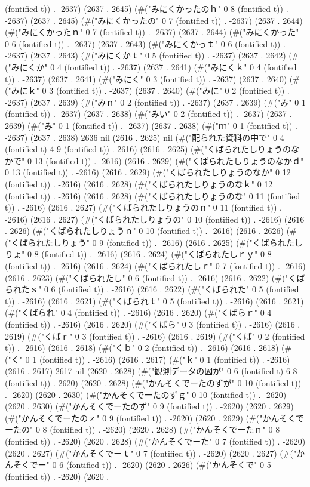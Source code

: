 (fontified t)) . -2637) (2637 . 2645) (#("みにくかったのｈ" 0 8 (fontified t)) . -2637) (2637 . 2645) (#("みにくかったの" 0 7 (fontified t)) . -2637) (2637 . 2644) (#("みにくかったｎ" 0 7 (fontified t)) . -2637) (2637 . 2644) (#("みにくかった" 0 6 (fontified t)) . -2637) (2637 . 2643) (#("みにくかっｔ" 0 6 (fontified t)) . -2637) (2637 . 2643) (#("みにくかｔ" 0 5 (fontified t)) . -2637) (2637 . 2642) (#("みにくか" 0 4 (fontified t)) . -2637) (2637 . 2641) (#("みにくｋ" 0 4 (fontified t)) . -2637) (2637 . 2641) (#("みにく" 0 3 (fontified t)) . -2637) (2637 . 2640) (#("みにｋ" 0 3 (fontified t)) . -2637) (2637 . 2640) (#("みに" 0 2 (fontified t)) . -2637) (2637 . 2639) (#("みｎ" 0 2 (fontified t)) . -2637) (2637 . 2639) (#("み" 0 1 (fontified t)) . -2637) (2637 . 2638) (#("みい" 0 2 (fontified t)) . -2637) (2637 . 2639) (#("み" 0 1 (fontified t)) . -2637) (2637 . 2638) (#("ｍ" 0 1 (fontified t)) . -2637) (2637 . 2638) 2636 nil (2616 . 2625) nil (#("配られた資料の中で" 0 4 (fontified t) 4 9 (fontified t)) . 2616) (2616 . 2625) (#("くばられたしりょうのなかで" 0 13 (fontified t)) . -2616) (2616 . 2629) (#("くばられたしりょうのなかｄ" 0 13 (fontified t)) . -2616) (2616 . 2629) (#("くばられたしりょうのなか" 0 12 (fontified t)) . -2616) (2616 . 2628) (#("くばられたしりょうのなｋ" 0 12 (fontified t)) . -2616) (2616 . 2628) (#("くばられたしりょうのな" 0 11 (fontified t)) . -2616) (2616 . 2627) (#("くばられたしりょうのｎ" 0 11 (fontified t)) . -2616) (2616 . 2627) (#("くばられたしりょうの" 0 10 (fontified t)) . -2616) (2616 . 2626) (#("くばられたしりょうｎ" 0 10 (fontified t)) . -2616) (2616 . 2626) (#("くばられたしりょう" 0 9 (fontified t)) . -2616) (2616 . 2625) (#("くばられたしりょ" 0 8 (fontified t)) . -2616) (2616 . 2624) (#("くばられたしｒｙ" 0 8 (fontified t)) . -2616) (2616 . 2624) (#("くばられたしｒ" 0 7 (fontified t)) . -2616) (2616 . 2623) (#("くばられたし" 0 6 (fontified t)) . -2616) (2616 . 2622) (#("くばられたｓ" 0 6 (fontified t)) . -2616) (2616 . 2622) (#("くばられた" 0 5 (fontified t)) . -2616) (2616 . 2621) (#("くばられｔ" 0 5 (fontified t)) . -2616) (2616 . 2621) (#("くばられ" 0 4 (fontified t)) . -2616) (2616 . 2620) (#("くばらｒ" 0 4 (fontified t)) . -2616) (2616 . 2620) (#("くばら" 0 3 (fontified t)) . -2616) (2616 . 2619) (#("くばｒ" 0 3 (fontified t)) . -2616) (2616 . 2619) (#("くば" 0 2 (fontified t)) . -2616) (2616 . 2618) (#("くｂ" 0 2 (fontified t)) . -2616) (2616 . 2618) (#("く" 0 1 (fontified t)) . -2616) (2616 . 2617) (#("ｋ" 0 1 (fontified t)) . -2616) (2616 . 2617) 2617 nil (2620 . 2628) (#("観測データの図が" 0 6 (fontified t) 6 8 (fontified t)) . 2620) (2620 . 2628) (#("かんそくでーたのずが" 0 10 (fontified t)) . -2620) (2620 . 2630) (#("かんそくでーたのずｇ" 0 10 (fontified t)) . -2620) (2620 . 2630) (#("かんそくでーたのず" 0 9 (fontified t)) . -2620) (2620 . 2629) (#("かんそくでーたのｚ" 0 9 (fontified t)) . -2620) (2620 . 2629) (#("かんそくでーたの" 0 8 (fontified t)) . -2620) (2620 . 2628) (#("かんそくでーたｎ" 0 8 (fontified t)) . -2620) (2620 . 2628) (#("かんそくでーた" 0 7 (fontified t)) . -2620) (2620 . 2627) (#("かんそくでーｔ" 0 7 (fontified t)) . -2620) (2620 . 2627) (#("かんそくでー" 0 6 (fontified t)) . -2620) (2620 . 2626) (#("かんそくで" 0 5 (fontified t)) . -2620) (2620 . 